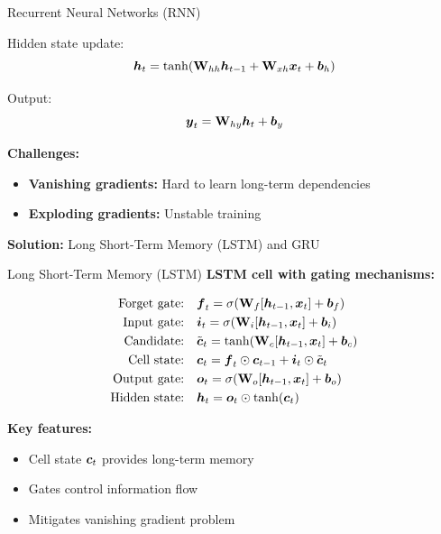 \documentclass[aspectratio=169]{beamer}
\begin{document}
\begin{frame}{Recurrent Neural Networks (RNN)}
  \begin{definitionbox}[title={RNN Architecture}]
    Hidden state update:
    \begin{equation}
      \boldsymbol{h}_t = \tanh(\mathbf{W}_{hh} \boldsymbol{h}_{t-1} + \mathbf{W}_{xh} \boldsymbol{x}_t + \boldsymbol{b}_h)
    \end{equation}

    Output:
    \begin{equation}
      \boldsymbol{y}_t = \mathbf{W}_{hy} \boldsymbol{h}_t + \boldsymbol{b}_y
    \end{equation}
  \end{definitionbox}

  \vspace{0.5em}

  \textbf{Challenges:}
  \begin{itemize}
    \item \textbf{Vanishing gradients:} Hard to learn long-term dependencies
    \item \textbf{Exploding gradients:} Unstable training
  \end{itemize}

  \textbf{Solution:} Long Short-Term Memory (LSTM) and GRU
\end{frame}

\begin{frame}{Long Short-Term Memory (LSTM)}
  \textbf{LSTM cell with gating mechanisms:}

  \begin{align*}
    \text{Forget gate:} \quad & \boldsymbol{f}_t = \sigma(\mathbf{W}_f [\boldsymbol{h}_{t-1}, \boldsymbol{x}_t] + \boldsymbol{b}_f) \\
    \text{Input gate:} \quad & \boldsymbol{i}_t = \sigma(\mathbf{W}_i [\boldsymbol{h}_{t-1}, \boldsymbol{x}_t] + \boldsymbol{b}_i) \\
    \text{Candidate:} \quad & \tilde{\boldsymbol{c}}_t = \tanh(\mathbf{W}_c [\boldsymbol{h}_{t-1}, \boldsymbol{x}_t] + \boldsymbol{b}_c) \\
    \text{Cell state:} \quad & \boldsymbol{c}_t = \boldsymbol{f}_t \odot \boldsymbol{c}_{t-1} + \boldsymbol{i}_t \odot \tilde{\boldsymbol{c}}_t \\
    \text{Output gate:} \quad & \boldsymbol{o}_t = \sigma(\mathbf{W}_o [\boldsymbol{h}_{t-1}, \boldsymbol{x}_t] + \boldsymbol{b}_o) \\
    \text{Hidden state:} \quad & \boldsymbol{h}_t = \boldsymbol{o}_t \odot \tanh(\boldsymbol{c}_t)
  \end{align*}

  \vspace{0.3em}

  \textbf{Key features:}
  \begin{itemize}
    \item Cell state $\boldsymbol{c}_t$ provides long-term memory
    \item Gates control information flow
    \item Mitigates vanishing gradient problem
  \end{itemize}
\end{frame}
\end{document}
